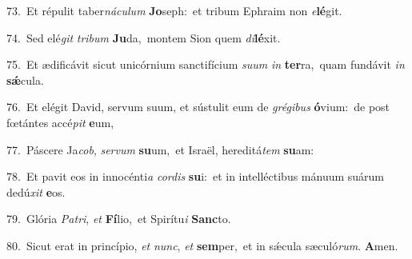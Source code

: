 {\numbfont\textcolor{\numbcolor}{73.}}~Et répulit taber\-\textit{ná}\-\textit{cu}\textit{lum} \textbf{Jo}\-seph:~\star et tribum Ephraim non \textit{e}\-\textbf{lé}git.\par
{\numbfont\textcolor{\numbcolor}{74.}}~Sed elé\textit{git} \textit{tri}\-\textit{bum} \textbf{Ju}\-da,~\star montem Sion quem \textit{di}\-\textbf{lé}xit.\par
{\numbfont\textcolor{\numbcolor}{75.}}~Et ædificávit sicut unicórnium sanctifícium \textit{su}\-\textit{um} \textit{in} \textbf{ter}\-ra,~\star quam fundávit \textit{in} \textbf{sǽ}\-cula.\par
{\numbfont\textcolor{\numbcolor}{76.}}~Et elégit David, servum suum, et sústulit eum de \textit{gré}\-\textit{gi}\textit{bus} \textbf{ó}\-vium:~\star de post fœtántes accé\textit{pit} \textbf{e}\-um,\par
{\numbfont\textcolor{\numbcolor}{77.}}~Páscere Ja\-\textit{cob}\-, \textit{ser}\-\textit{vum} \textbf{su}\-um,~\star et Israël, hereditá\textit{tem} \textbf{su}\-am:\par
{\numbfont\textcolor{\numbcolor}{78.}}~Et pavit eos in innocénti\textit{a} \textit{cor}\-\textit{dis} \textbf{su}\-i:~\star et in intelléctibus mánuum suárum dedú\textit{xit} \textbf{e}\-os.\par
{\numbfont\textcolor{\numbcolor}{79.}}~Glória \textit{Pa}\-\textit{tri}, \textit{et} \textbf{Fí}\-lio,~\star et Spirítu\textit{i} \textbf{Sanc}\-to.\par
{\numbfont\textcolor{\numbcolor}{80.}}~Sicut erat in princípio, \textit{et} \textit{nunc}\-, \textit{et} \textbf{sem}\-per,~\star et in sǽcula sæculó\-\textit{rum}\-. \textbf{A}\-men.\par
